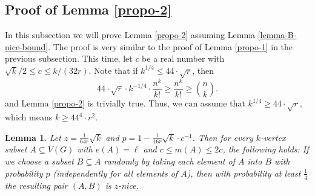 \documentclass[11pt]{article}
\newtheorem{lemma}[theorem]{Lemma}
\theoremstyle{definition}
\numberwithin{equation}{section}
\begin{document}
\subsection{Proof of Lemma \ref{propo-2}}

In this subsection we will prove Lemma \ref{propo-2} assuming Lemma \ref{lemma-B-nice-bound}. The proof is very similar to the proof of Lemma \ref{propo-1} in the previous subsection. This time, let $c$ be a real number with $\sqrt{k}/2\leq c\leq k/(32r)$. Note that if $k^{1/4}\leq 44 \cdot \sqrt{r}$, then
\[44\cdot \sqrt{r}\cdot k^{-1/4}\cdot \frac{n^k}{k!}\geq \frac{n^k}{k!}\geq {n \choose k}.\]
and Lemma \ref{propo-2} is trivially true. Thus, we can assume that $k^{1/4}\geq 44 \cdot \sqrt{r}$, which means $k\geq 44^4 \cdot r^2$.

\begin{lemma}\label{lemma-A-2}Let $z=\frac{1}{64r}\sqrt{k}$ and $p=1-\frac{1}{16r}\sqrt{k}\cdot c^{-1}$. Then for every $k$-vertex subset $A\subseteq V(G)$ with $e(A)=\ell$ and $c\leq m(A)\leq 2c$, the following holds: If we choose a subset $B\subseteq A$ randomly by taking each element of $A$ into $B$ with probability $p$ (independently for all elements of $A$), then with probability at least $\frac{1}{4}$ the resulting pair $(A,B)$ is $z$-nice.
\end{lemma}
\end{document}
